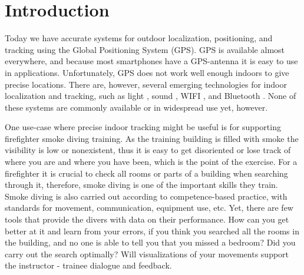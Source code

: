 \documentclass[../Main/thesis.tex]{subfiles}
\begin{document}
\chapter{Introduction}
\label{ch:introduction}


Today we have accurate systems for outdoor localization, positioning, and tracking using the Global Positioning System (GPS). 
GPS is available almost everywhere, and because most smartphones have a GPS-antenna it is easy to use in applications.
Unfortunately, GPS does not work well enough indoors to give precise locations.
There are, however, several emerging technologies for indoor localization and tracking, such as light \citep{xiaohan2010improved}, sound \citep{schweinzer2010ultrasonic}, WIFI  \citep{chang2010robust}, and Bluetooth \citep{Takahashi2016}.
None of these systems are commonly available or in widespread use yet, however.

One use-case where precise indoor tracking might be useful is for supporting firefighter smoke diving training. 
As the training building is filled with smoke the visibility is low or nonexistent, thus it is easy to get disoriented or lose track of where you are and where you have been, which is the point of the exercise.
For a firefighter it is crucial to check all rooms or parts of a building when searching through it, therefore, smoke diving is one of the important skills they train.
Smoke diving is also carried out according to competence-based practice, with standards for movement, communication, equipment use, etc.
Yet, there are few tools that provide the divers with data on their performance.
How can you get better at it and learn from your errors, if you think you searched all the rooms in the building, and no one is able to tell you that you missed a bedroom?
Did you carry out the search optimally?
Will visualizations of your movements support the instructor - trainee dialogue and feedback.
\end{document}
